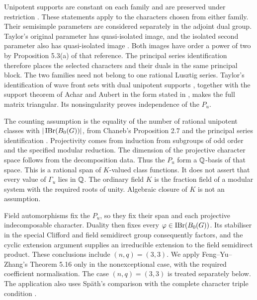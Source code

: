 Unipotent supports are constant on each family
\cite[Theorem~3.7]{GeckMalle2000} and are preserved under restriction
\cite[Lemmas~14.12 and~14.15]{Taylor2016}. These statements apply to
the characters chosen from either family. Their semisimple parameters are
considered separately in the adjoint dual group. Taylor's original
parameter has quasi-isolated image, and the isolated second parameter
also has quasi-isolated image \cite[Proposition~2.3(b)]{Bonnafe2005}.
Both images have order a power of two by Proposition 5.3(a) of that
reference. The principal series identification therefore places the
selected characters and their duals in the same principal block.
The two families need not belong to one rational Lusztig series.
Taylor's identification of wave front sets with dual unipotent supports
\cite[Lemma~14.15]{Taylor2016}, together with the support theorem of
Achar and Aubert in the form stated in
\cite[Proposition~15.2]{Taylor2016}, makes the full matrix triangular.
Its nonsingularity proves independence of the $P_u$.

The counting assumption is the equality of the number of rational unipotent
classes with $|\operatorname{IBr}(B_0(G))|$, from Chaneb's Proposition 2.7 and the
principal series identification \cite{Chaneb2021}.
Projectivity comes from induction from subgroups of odd order and the
specified modular reduction. The dimension of the projective
character space follows from the decomposition data. Thus the
$P_u$ form a $\mathbb Q$-basis of that space. This is a rational span of
$K$-valued class functions. It does not assert that every value of
$\Gamma_u$ lies in $\mathbb Q$. The ordinary field $K$ is the fraction field of
a modular system with the required roots of unity. Algebraic closure of
$K$ is not an assumption.

Field automorphisms fix the $P_u$, so they fix their span and each
projective indecomposable character. Duality then fixes every
$\varphi\in\operatorname{IBr}(B_0(G))$. Its stabiliser in the special Clifford
and field semidirect group consequently factors, and the cyclic
extension argument supplies an irreducible extension to the
field semidirect product. These conclusions include $(n,q)=(3,3)$.
We apply Feng--Yu--Zhang's Theorem 5.16 \cite{FengYuZhang2024} only
in the nonexceptional case, with the required coefficient normalisation.
The case $(n,q)=(3,3)$ is treated separately below. The application also uses Sp\"ath's comparison
with the complete character triple condition
\cite[Theorem~4.4]{Spath2017Triples}.

